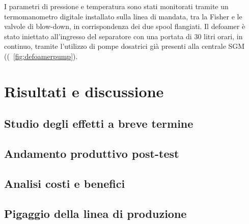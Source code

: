 I parametri di pressione e temperatura sono stati monitorati tramite un termomanometro digitale installato sulla linea di mandata, tra la Fisher e le valvole di blow-down, in corrispondenza dei due spool flangiati. Il defoamer è stato iniettato all'ingresso del separatore con una portata di 30 litri orari, in continuo, tramite l'utilizzo di pompe dosatrici già presenti alla centrale SGM ((\figurename~\ref{fig:defoamerpump}).

\section{Risultati e discussione}
\subsection{Studio degli effetti a breve termine}
\subsection{Andamento produttivo post-test}
\subsection{Analisi costi e benefici}
\subsection{Pigaggio della linea di produzione}